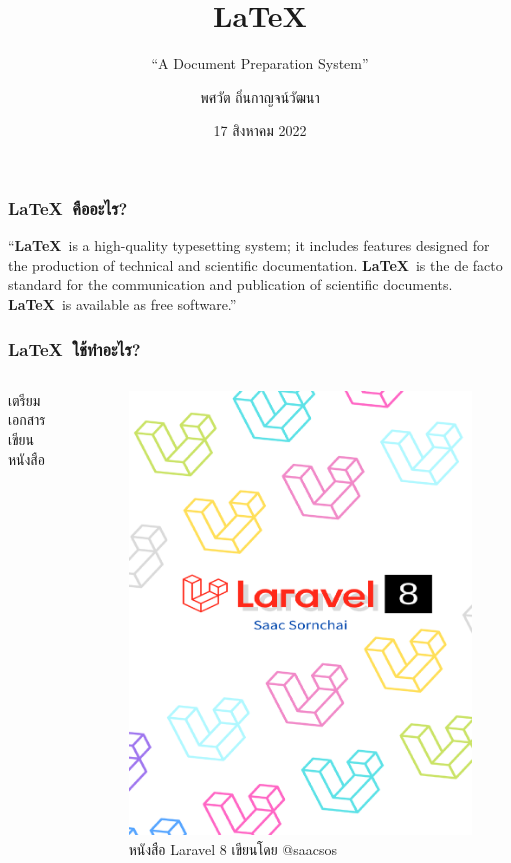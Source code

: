 \documentclass[xetex,serif,aspectratio=1610]{beamer}
\title[\LaTeX]{\Huge\textbf{\LaTeX{}}}
\subtitle{``A Document Preparation System''}
\author[naiithink]{พศวัต ถิ่นกาญจน์วัฒนา}
\date[CNC 2022]{17 สิงหาคม 2022}
\begin{document}
\maketitle
\appendix

\begin{frame}
\frametitle{\textbf{\LaTeX{}}~คืออะไร?}
``\textbf{\LaTeX{}}~is a high-quality typesetting system; it includes features designed
for the production of technical and scientific documentation. \textbf{\LaTeX{}}~is the
de facto standard for the communication and publication of scientific documents.
\textbf{\LaTeX{}}~is available as free software.''
\end{frame}

\begin{frame}
\frametitle{\textbf{\LaTeX{}}~ใช้ทำอะไร?}
\begin{columns}[c]
เตรียมเอกสาร เขียนหนังสือ
\begin{figure}
    \includegraphics[width=.55\textwidth]{./pdf/Laravel8-saacsos_cover.pdf}
    \caption*{หนังสือ Laravel 8 เขียนโดย @saacsos}
    \label{fig:book-saacsos-laravel8}
\end{figure}
\end{columns}
\end{frame}
\end{document}
